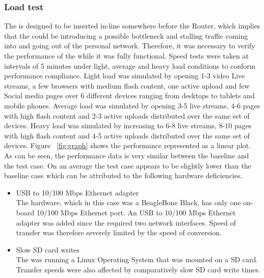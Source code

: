 \subsubsection{Load test}
\label{sec:eval:loadtest}
The \nodename is designed to be inserted in-line somewhere before the Router, which implies that the \nodename could be introducing a possible bottleneck and stalling traffic coming into and going out of the personal network. Therefore, it was necessary to verify the performance of the \nodename while it was fully functional. Speed tests were taken at intervals of 5 minutes under light, average and heavy load conditions to conform performance compliance. Light load was simulated by opening 1-3 video Live streams, a few browsers with medium flash content, one active upload and few Social media pages over 6 different devices ranging from desktops to tablets and mobile phones. Average load was simulated by opening 3-5 live streams, 4-6 pages with high flash content and 2-3 active uploads distributed over the same set of devices. Heavy load was simulated by increasing to 6-8 live streams, 8-10 pages with high flash content and 4-5 active uploads distributed over the same set of devices. Figure ~\ref{fig:graph} shows the performance represented as a linear plot. As can be seen, the performance data is very similar between the baseline and the test case. On an average the test case appears to be slightly lower than the baseline case which can be attributed to the following hardware deficiencies.\\
\begin{itemize}
    \item USB to 10/100 Mbps Ethernet adapter\\
    The \nodename hardware, which in this case was a BeagleBone Black, has only one on-board 10/100 Mbps Ethernet port. An USB to 10/100 Mbps Ethernet adapter was added since the \nodename required two network interfaces. Speed of transfer was therefore severely limited by the speed of conversion.
    \item Slow SD card writes\\
    The \nodename was running a Linux Operating System that was mounted on a SD card. Transfer speeds were also affected by comparatively slow SD card write times.
\end{itemize}


